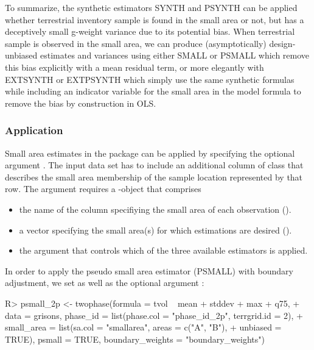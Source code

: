 \documentclass[article]{jss}
\begin{document}
To summarize, the synthetic estimators SYNTH and PSYNTH can be applied whether terrestrial inventory sample is found in the small area or not, but has a deceptively small g-weight variance due to its potential bias.  When terrestrial sample is observed in the small area, we can produce (asymptotically) design-unbiased estimates and variances using either SMALL or PSMALL which remove this bias explicitly with a mean residual term, or more elegantly with EXTSYNTH or EXTPSYNTH which simply use the same synthetic formulas while including an indicator variable for the small area in the model formula to remove the bias by construction in OLS.


\subsubsection{Application}

Small area estimates in the  package can be applied by specifying the optional argument . The input data set has to include an additional column of class  that describes the small area membership of the sample location represented by that row. The argument  requires a -object that comprises

\begin{itemize}
  \itemsep0em
  \item the name of the column specifiying the small area of each observation ().
  \item a vector specifying the small area(s) for which estimations are desired ().
  \item the argument  that controls which of the three available estimators is applied.
\end{itemize}

In order to apply the pseudo small area estimator (PSMALL) with boundary adjustment, we set  as well as the optional argument :

\begin{Schunk}
\begin{Sinput}
R> psmall_2p <- twophase(formula = tvol ~ mean + stddev + max + q75, 
+    data = grisons, phase_id = list(phase.col = "phase_id_2p", terrgrid.id = 2),
+    small_area = list(sa.col = "smallarea", areas = c("A", "B"),
+    unbiased = TRUE), psmall = TRUE, boundary_weights = "boundary_weights")
\end{Sinput}
\end{Schunk}
\end{document}
